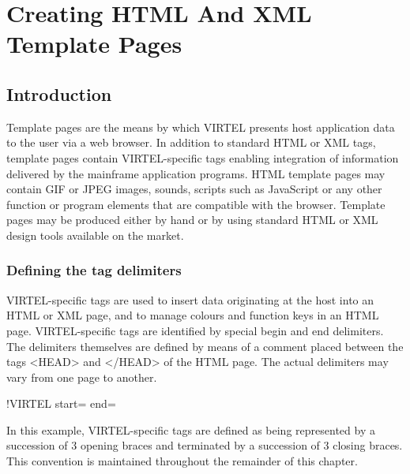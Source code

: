 \documentclass[letterpaper,10pt,english]{sphinxmanual}
\begin{document}
\section{Creating HTML And XML Template Pages}
\label{\detokenize{User_Guide:v457ug-creating-html}}\label{\detokenize{User_Guide:creating-html-and-xml-template-pages}}

\subsection{Introduction}
\label{\detokenize{User_Guide:index-4}}\label{\detokenize{User_Guide:id1}}
Template pages are the means by which VIRTEL presents host application data to the user via a web browser. In addition to standard HTML or XML tags, template pages contain VIRTEL-specific tags enabling integration of information delivered by the mainframe application programs. HTML template pages may contain GIF or JPEG images, sounds, scripts such as JavaScript or any other function or program elements that are compatible with the browser. Template pages may be produced either by hand or by using standard HTML or XML design tools available on the market.


\subsubsection{Defining the tag delimiters}
\label{\detokenize{User_Guide:defining-the-tag-delimiters}}
VIRTEL-specific tags are used to insert data originating at the host into an HTML or XML page, and to manage colours and function keys in an HTML page. VIRTEL-specific tags are identified by special begin and end delimiters. The delimiters themselves are defined by means of a comment placed between the tags \textless{}HEAD\textgreater{} and \textless{}/HEAD\textgreater{} of the HTML page. The actual delimiters may vary from one page to another.

\begin{sphinxVerbatim}[commandchars=\\\{\}]
\PYGZlt{}!\PYGZhy{}\PYGZhy{}VIRTEL start=\PYGZdq{}\PYGZob{}\PYGZob{}\PYGZob{}\PYGZdq{} end=\PYGZdq{}\PYGZcb{}\PYGZcb{}\PYGZcb{}\PYGZdq{} \PYGZhy{}\PYGZhy{}\PYGZgt{}
\end{sphinxVerbatim}

In this example, VIRTEL-specific tags are defined as being represented by a succession of 3 opening braces and terminated by a succession of 3 closing braces. This convention is maintained throughout the remainder of this chapter.
\end{document}
